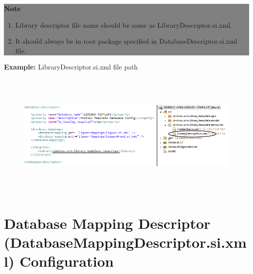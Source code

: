 	\begin{center}
		\colorbox{grey}{
			\parbox[t]{.8\linewidth}{
				\fontsize{11pt}{11pt}\selectfont %
				\vspace*{0.1cm} %
		
				\hfill \textbf{Note} \\

				\hfill 

				\begin{enumerate}

					\item \small Library descriptor file name should be same as LibraryDescriptor.si.xml.

					\item \small It should always be in root package specified in DatabaseDescriptor.si.xml file.
	
				\end{enumerate}

				\vspace*{0.0cm} %
			}
		}

\end{center}

		\par
		\textbf{Example:} LibraryDescriptor.si.xml file path
		\begin{figure}[htbp]
			\centering
				\includegraphics[height=6.2cm]{Resources/siminov_library_template_path_example.png}
		\end{figure}



\newpage
\section{Database Mapping Descriptor (DatabaseMappingDescriptor.si.xml) Configuration}
	
